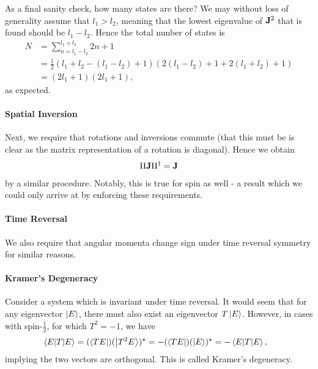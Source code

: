 As a final sanity check, how many states are there? We may without loss of generality assume that $l_{1} > l_{2}$, meaning that the lowest eigenvalue of $\vb{J}^{2}$ that is found should be $l_{1} - l_{2}$. Hence the total nunber of states is
\begin{align*}
	N &= \sum\limits_{n = l_{1} - l_{2}}^{l_{1} + l_{2}}2n + 1 \\
	  &= \frac{1}{2}(l_{1} + l_{2} - (l_{1} - l_{2}) + 1)\left(2(l_{1} - l_{2}) + 1 + 2(l_{1} + l_{2}) + 1\right) \\
	  &= (2l_{1} + 1)\left(2l_{1} + 1\right),
\end{align*}
as expected.

\paragraph{Spatial Inversion}
Next, we require that rotations and inversions commute (that this must be is clear as the matrix representation of a rotation is diagonal). Hence we obtain
\begin{align*}
	\Pi\vb{J}\Pi^{\dagger} = \vb{J}
\end{align*}
by a similar procedure. Notably, this is true for spin as well - a result which we could only arrive at by enforcing these requirements.

\paragraph{Time Reversal}
We also require that angular momenta change sign under time reversal symmetry for similar reasons.

\paragraph{Kramer's Degeneracy}
Consider a system which is invariant under time reversal. It would seem that for any eigenvector $\ket{E}$, there must also exist an eigenvector $T\ket{E}$. However, in cases with spin-$\frac{1}{2}$, for which $T^{2} = -1$, we have
\begin{align*}
	\mel{E}{T}{E} &= (\bra{TE})(\ket{T^{2}E})^{\star} = -(\bra{TE})(\ket{E})^{\star} = -\mel{E}{T}{E},
\end{align*}
implying the two vectors are orthogonal. This is called Kramer's degeneracy.

